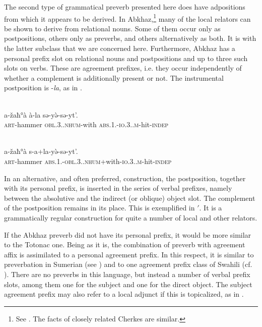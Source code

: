 The second type of grammatical preverb presented here does have adpositions from which it appears to be derived. In Abkhaz,\footnote{See \citet[113--149]{Hewitt1979}. The facts of closely related Cherkes are similar.} many of the local relators can be shown to derive from relational nouns. Some of them occur only as postpositions, others only as preverbs, and others alternatively as both. It is with the latter subclass that we are concerned here. Furthermore, Abkhaz has a personal prefix slot on relational nouns and postpositions and up to three such slots on verbs. These are agreement prefixes, i.e. they occur independently of whether a complement \np is additionally present or not. The instrumental postposition is -\textit{la}, as in .

\ea\label{ex:E83}
\\
 \gll a-žaħ°à  à-la  sə-y\`ə-sə-yt'.\\
 \textsc{art}-hammer  \textsc{obl}.3.\glsg.\textsc{nhum}-with  \textsc{abs}.1.\glsg-\textsc{io}.3.\glsg.\textsc{m}-hit-\textsc{indep}\\
\\
\z
\noindent \begin{exe} 
\gll a-žaħ°à  s-a+la-y\`ə-sə-yt'.\\
 \textsc{art}-hammer \textsc{abs}.1.\glsg-\textsc{obl}.3.\glsg.\textsc{nhum}+with-\textsc{io}.3.\glsg.\textsc{m}-hit-\textsc{indep}\\
\end{exe}

\noindent In an alternative, and often preferred, construction, the postposition, together with its personal prefix, is inserted in the series of verbal prefixes, namely between the absolutive and the indirect (or oblique) object slot. The \np complement of the postposition remains in its place. This is exemplified in $'$. It is a grammatically regular construction for quite a number of local and other relators.

If the Abkhaz preverb did not have its personal prefix, it would be more similar to the Totonac one. Being as it is, the combination of preverb with agreement affix is assimilated to a personal agreement prefix. In this respect, it is similar to preverbation in Sumerian (see \citealt[46--49, 59f]{Falkenstein1959}) and to one agreement prefix class of Swahili (cf. \citealt[48]{Kahr1975}). There are no preverbs in this language, but instead a number of verbal prefix slots, among them one for the subject and one for the direct object. The subject agreement prefix may also refer to a local adjunct if this is topicalized, as in .

